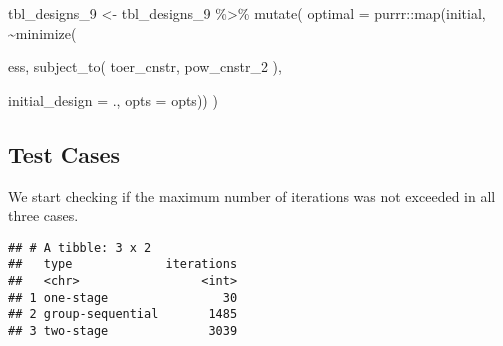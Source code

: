 \documentclass[
]{book}
\newenvironment{Shaded}{\begin{snugshade}}{\end{snugshade}}
\newcommand{\AttributeTok}[1]{\textcolor[rgb]{0.77,0.63,0.00}{#1}}
\newcommand{\FunctionTok}[1]{\textcolor[rgb]{0.00,0.00,0.00}{#1}}
\newcommand{\NormalTok}[1]{#1}
\newcommand{\OtherTok}[1]{\textcolor[rgb]{0.56,0.35,0.01}{#1}}
\newcommand{\SpecialCharTok}[1]{\textcolor[rgb]{0.00,0.00,0.00}{#1}}
\begin{document}
\begin{Shaded}
\begin{Highlighting}[]
\NormalTok{tbl\_designs\_9 }\OtherTok{\textless{}{-}}\NormalTok{ tbl\_designs\_9 }\SpecialCharTok{\%\textgreater{}\%} 
    \FunctionTok{mutate}\NormalTok{(}
       \AttributeTok{optimal =}\NormalTok{ purrr}\SpecialCharTok{::}\FunctionTok{map}\NormalTok{(initial, }\SpecialCharTok{\textasciitilde{}}\FunctionTok{minimize}\NormalTok{(}
         
\NormalTok{          ess,}
          \FunctionTok{subject\_to}\NormalTok{(}
\NormalTok{              toer\_cnstr,}
\NormalTok{              pow\_cnstr\_2}
\NormalTok{          ),}
          
          \AttributeTok{initial\_design =}\NormalTok{ ., }
          \AttributeTok{opts           =}\NormalTok{ opts)) )}
\end{Highlighting}
\end{Shaded}

\hypertarget{test-cases-8}{%
\subsection{Test Cases}\label{test-cases-8}}

We start checking if the maximum number of iterations was not exceeded in all
three cases.

\begin{Shaded}
\end{Shaded}

\begin{verbatim}
## # A tibble: 3 x 2
##   type             iterations
##   <chr>                 <int>
## 1 one-stage                30
## 2 group-sequential       1485
## 3 two-stage              3039
\end{verbatim}
\end{document}
